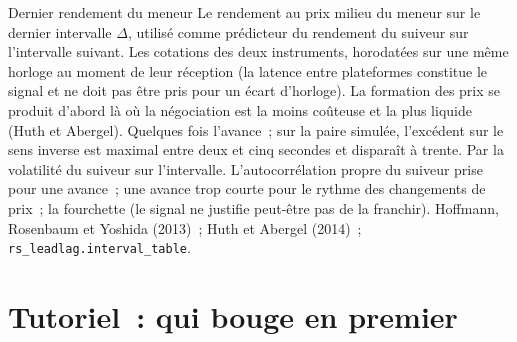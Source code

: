 \begin{predictorcard}{Dernier rendement du meneur}\label{pred:rs:cross-sectional-and-cross-asset-features:leader}
 Le rendement au prix milieu du meneur sur le dernier intervalle $\Delta$, utilisé comme prédicteur du rendement du suiveur sur l'intervalle suivant.
 Les cotations des deux instruments, horodatées sur une même horloge au moment de leur réception (la latence entre plateformes constitue le
signal et ne doit pas être pris pour un écart d'horloge).
 La formation des prix se produit d'abord là où la négociation est la moins coûteuse et la plus liquide (Huth et Abergel).
 Quelques fois l'avance~; sur la paire simulée, l'excédent sur le sens inverse est maximal entre deux et
cinq secondes et disparaît à trente.
 Par la volatilité du suiveur sur l'intervalle.
 L'autocorrélation propre du suiveur prise pour une avance~; une avance trop courte pour le rythme des changements de prix~; la fourchette
(le signal ne justifie peut-être pas de la franchir).
 Hoffmann, Rosenbaum et Yoshida (2013)~; Huth et Abergel (2014)~; \texttt{rs\_leadlag.interval\_table}.
\end{predictorcard}

\section{Tutoriel~: qui bouge en premier}\label{tut:rs:cross-sectional-and-cross-asset-features:tut}

